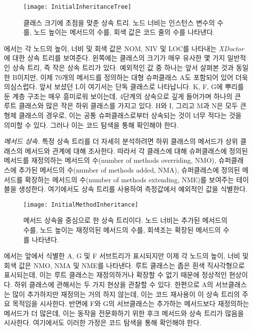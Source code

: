 \documentclass[a4paper,10pt,twoside]{book}
\begin{document}
\begin{figure}
\begin{center}
\texttt{[image: InitialInheritanceTree]}
\caption{클래스 크기에 초점을 맞춘 상속 트리. 노드 너비는 인스턴스 변수의 수를, 노드 높이는 메서드의 수를, 회색 값은 코드 줄의 수를 나타낸다. }
\end{center}
\end{figure}

에서는 각 노드의 높이, 너비 및 회색 값은 NOM, NIV 및 LOC를 나타내는 \emph{XDoctor}에 대한 상속 트리를 보여준다. 왼쪽에는 클래스의 크기가 매우 유사한 몇 가지 일반적인 상속 트리, 즉 작은 상속 트리가 있다. 예외적인 값 중 하나는 앞서 살펴본 것과 동일한 B이지만, 이제 70개의 메서드를 정의하는 대형 슈퍼클래스 A도 포함되어 있어 더욱 의심스럽다. 앞서 보셨던 L이 여기서는 단독 클래스로 나타납니다. K, F, G에 뿌리를 둔 계층 구조는 매우 흥미로워 보이는데, 4단계의 상속으로 깊게 들어가며 하나의 큰 루트 클래스와 많은 작은 하위 클래스를 가지고 있다. H와 I, 그리고 M과 N은 모두 큰 형제 클래스의 경우로, 이는 공통 슈퍼클래스로부터 상속되는 것이 너무 적다는 것을 의미할 수 있다. 그러나 이는 코드 탐색을 통해 확인해야 한다.

\noindent
\emph{메서드 상속.}
특정 상속 트리를 더 자세히 분석하려면 하위 클래스의 메서드가 상위 클래스의 메서드와 관계에 대해 조사한다. 따라서 각 클래스에 대해 슈퍼클래스에 정의된 메서드를 재정의하는 메서드의 수(number of methods overriding, NMO), 슈퍼클래스에 추가된 메서드의 수(number of methods added, NMA), 슈퍼클래스에 정의된 메서드를 확장하는 메서드의 수(number of methods extending, NME)를 보여주는 테이블을 생성한다. 여기에서도 상속 트리를 사용하여 측정값에서 예외적인 값을 식별한다.

\begin{figure}
\begin{center}
\texttt{[image: InitialMethodInheritance]}
\caption{메서드 상속을 중심으로 한 상속 트리이다. 노드 너비는 추가된 메서드의 수를, 노드 높이는 재정의된 메서드의 수를, 회색조는 확장된 메서드의 수를 나타낸다.}
\end{center}
\end{figure}

에서는 앞에서 식별한 A, G 및 F 서브트리가 표시되지만 이제 각 노드의 높이, 너비 및 회색 값은 NMO, NMA 및 NME를 나타낸다. 루트 클래스는 좁은 흰색 직사각형으로 표시되는데, 이는 루트 클래스는 재정의하거나 확장할 수 없기 때문에 정상적인 현상이다. 하위 클래스에 관해서는 두 가지 현상을 관찰할 수 있다. 한편으로 A의 서브클래스는 많이 추가하지만 재정의는 거의 하지 않는데, 이는 코드 재사용이 이 상속 트리의 주요 목적임을 시사한다. 반면에 F와 G의 서브클래스는 추가하는 메서드보다 재정의하는 메서드가 더 많은데, 이는 동작을 전문화하기 위한 후크 메서드와 상속 트리가 많음을 시사한다. 여기에서도 이러한 가정은 코드 탐색을 통해 확인해야 한다. 
\end{document}
